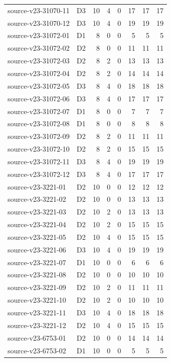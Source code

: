 \begin{longtable}{p{}lrrrrrr}
source-v23-31070-11 & D3 & 10 & 4 & 0 & 17 & 17 & 17\\
source-v23-31070-12 & D3 & 10 & 4 & 0 & 19 & 19 & 19\\
source-v23-31072-01 & D1 & 8 & 0 & 0 & 5 & 5 & 5\\
source-v23-31072-02 & D2 & 8 & 0 & 0 & 11 & 11 & 11\\
source-v23-31072-03 & D2 & 8 & 2 & 0 & 13 & 13 & 13\\
source-v23-31072-04 & D2 & 8 & 2 & 0 & 14 & 14 & 14\\
source-v23-31072-05 & D3 & 8 & 4 & 0 & 18 & 18 & 18\\
source-v23-31072-06 & D3 & 8 & 4 & 0 & 17 & 17 & 17\\
source-v23-31072-07 & D1 & 8 & 0 & 0 & 7 & 7 & 7\\
source-v23-31072-08 & D1 & 8 & 0 & 0 & 8 & 8 & 8\\
source-v23-31072-09 & D2 & 8 & 2 & 0 & 11 & 11 & 11\\
source-v23-31072-10 & D2 & 8 & 2 & 0 & 15 & 15 & 15\\
source-v23-31072-11 & D3 & 8 & 4 & 0 & 19 & 19 & 19\\
source-v23-31072-12 & D3 & 8 & 4 & 0 & 17 & 17 & 17\\
source-v23-3221-01 & D2 & 10 & 0 & 0 & 12 & 12 & 12\\
source-v23-3221-02 & D2 & 10 & 0 & 0 & 13 & 13 & 13\\
source-v23-3221-03 & D2 & 10 & 2 & 0 & 13 & 13 & 13\\
source-v23-3221-04 & D2 & 10 & 2 & 0 & 15 & 15 & 15\\
source-v23-3221-05 & D2 & 10 & 4 & 0 & 15 & 15 & 15\\
source-v23-3221-06 & D3 & 10 & 4 & 0 & 19 & 19 & 19\\
source-v23-3221-07 & D1 & 10 & 0 & 0 & 6 & 6 & 6\\
source-v23-3221-08 & D2 & 10 & 0 & 0 & 10 & 10 & 10\\
source-v23-3221-09 & D2 & 10 & 2 & 0 & 11 & 11 & 11\\
source-v23-3221-10 & D2 & 10 & 2 & 0 & 10 & 10 & 10\\
source-v23-3221-11 & D3 & 10 & 4 & 0 & 18 & 18 & 18\\
source-v23-3221-12 & D2 & 10 & 4 & 0 & 15 & 15 & 15\\
source-v23-6753-01 & D2 & 10 & 0 & 0 & 14 & 14 & 14\\
source-v23-6753-02 & D1 & 10 & 0 & 0 & 5 & 5 & 5\\

\end{longtable}
